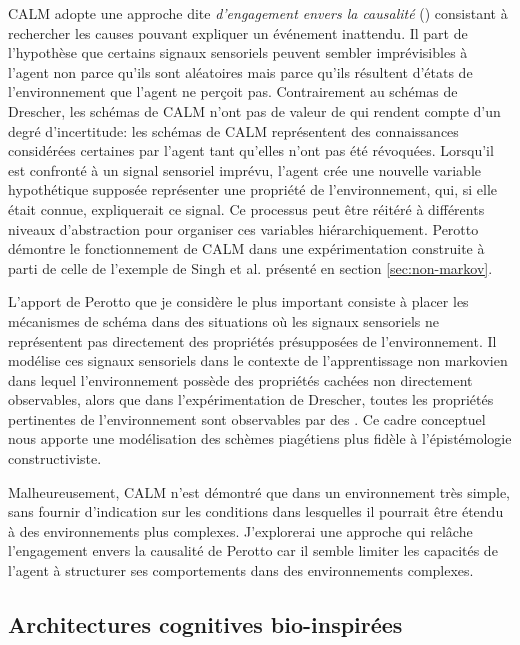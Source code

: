 CALM adopte une approche dite \emph{d'engagement envers la causalité} () consistant à rechercher les causes pouvant expliquer un événement inattendu.
Il part de l'hypothèse que certains signaux sensoriels peuvent sembler imprévisibles à l'agent non parce qu'ils sont aléatoires mais parce qu'ils résultent d'états de l'environnement que l'agent ne perçoit pas. 
Contrairement au schémas de Drescher, les schémas de CALM n'ont pas de valeur de  qui rendent compte d'un degré d'incertitude: les schémas de CALM représentent des connaissances considérées certaines par l'agent tant qu'elles n'ont pas été révoquées. 
Lorsqu'il est confronté à un signal sensoriel imprévu, l'agent crée une nouvelle variable hypothétique supposée représenter une propriété de l'environnement, qui, si elle était connue, expliquerait ce signal.
Ce processus peut être réitéré à différents niveaux d'abstraction pour organiser ces variables hiérarchiquement.
Perotto démontre le fonctionnement de CALM dans une expérimentation construite à parti de celle de l'exemple de Singh et al. présenté en section  \ref{sec:non-markov}.

L'apport de Perotto que je considère le plus important consiste à placer les mécanismes de schéma dans des situations où les signaux sensoriels ne représentent pas directement des propriétés présupposées de l'environnement.
Il modélise ces signaux sensoriels dans le contexte de l'apprentissage non markovien dans lequel l'environnement possède des propriétés cachées non directement observables, alors que dans l'expérimentation de Drescher, toutes les propriétés pertinentes de l'environnement sont observables par des .
Ce cadre conceptuel nous apporte une modélisation des schèmes piagétiens plus fidèle à l'épistémologie constructiviste.

Malheureusement, CALM n'est démontré que dans un environnement très simple, sans fournir d'indication sur les conditions dans lesquelles il pourrait être étendu à des environnements plus complexes. 
J'explorerai une approche qui relâche l'engagement envers la causalité de Perotto car il semble limiter les capacités de l'agent à structurer ses comportements dans des environnements complexes.  


\subsection{Architectures cognitives bio-inspirées}
\label{sec:architectures}

